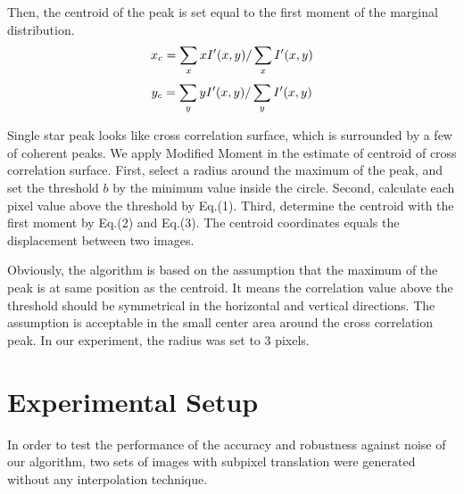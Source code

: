 \documentclass[conference]{IEEEtran}
\begin{document}
Then, the centroid of the peak is set equal to the first moment of the marginal distribution.
\begin{equation}
            x_{c}=\sum_{x} xI'(x,y)/\sum_{x} I'(x,y)  \\
\end{equation}
\begin{equation}
            y_{c}=\sum_{y} yI'(x,y)/\sum_{y} I'(x,y)  \\
\end{equation}

Single star peak looks like cross correlation surface, which is surrounded by a few of coherent peaks. We apply Modified Moment in the estimate of centroid of cross correlation surface. First, select a radius around the maximum of the peak, and set the threshold $b$ by the minimum value inside the circle. Second, calculate each pixel value above the threshold by Eq.(1). Third, determine the centroid with the first moment by Eq.(2) and Eq.(3). The centroid coordinates equals the displacement between two images.

Obviously, the algorithm is based on the assumption that the maximum of the peak is at same position as the centroid. It means the correlation value above the threshold should be symmetrical in the horizontal and vertical directions. The assumption is acceptable in the small center area around the cross correlation peak. In our experiment, the radius was set to 3 pixels.

\section{Experimental Setup}
In order to test the performance of the accuracy and robustness against noise of our algorithm, two sets of images with subpixel translation were generated without any interpolation technique.
\end{document}
